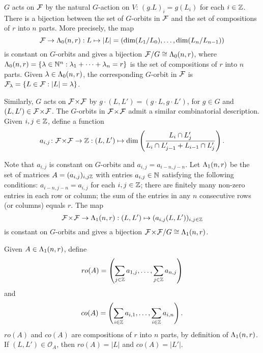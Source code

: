 \documentclass[a4paper, 11pt]{report}
\begin{document}
$G$ acts on $\mathcal{F}$ by the natural $G$-action on $V$: $(g.L)_i = g(L_i)$ for each $i\in\mathbb{Z}$. There is a bijection between the set of $G$-orbits in $\mathcal{F}$ and the set of compositions of $r$ into $n$ parts. More precisely, the map
\begin{equation*}
\mathcal{F}\to\Lambda_0(n,r):L\mapsto |L|=\left(\dim(L_1/L_0),\ldots,\dim(L_n/L_{n-1})\right)
\end{equation*}
is constant on $G$-orbits and gives a bijection $\mathcal{F}/G\cong\Lambda_0(n,r)$, where $\Lambda_0(n,r)=\{\lambda\in\mathbb{N}^n: \lambda_1+\cdots +\lambda_n = r\}$ is the set of compositions of $r$ into $n$ parts. Given $\lambda\in\Lambda_0(n,r)$, the corresponding $G$-orbit in $\mathcal{F}$ is $\mathcal{F}_\lambda=\{L\in\mathcal{F}:|L|=\lambda\}$.

Similarly, $G$ acts on ${\mathcal{F}\!\times\!\mathcal{F}}$ by $g\cdot (L,L') = (g\cdot L,g\cdot L')$, for $g\in G$ and $(L,L')\in{\mathcal{F}\!\times\!\mathcal{F}}$. The $G$-orbits in ${\mathcal{F}\!\times\!\mathcal{F}}$ admit a similar combinatorial description. Given $i,j\in\mathbb{Z}$, define a function
\begin{equation*}
a_{i,j}\colon{\mathcal{F}\!\times\!\mathcal{F}}\to\mathbb{Z}:(L,L')\mapsto \dim\left(\frac{L_i\cap L_j'}{L_i\cap L_{j-1}' + L_{i-1}\cap L_j'}\right).
\end{equation*}

Note that $a_{i,j}$ is constant on $G$-orbits and $a_{i,j}=a_{i-n,j-n}$. Let $\Lambda_1(n,r)$ be the set of matrices $A=(a_{i,j})_{i,j\mathbb{Z}}$ with entries $a_{i,j}\in\mathbb{N}$ satisfying the following conditions: $a_{i-n,j-n} = a_{i,j}$ for each $i,j\in\mathbb{Z}$; there are finitely many non-zero entries in each row or column; the sum of the entries in any $n$ consecutive rows (or columns) equals $r$. The map
\begin{equation*}
{\mathcal{F}\!\times\!\mathcal{F}}\to\Lambda_1(n,r):(L,L')\mapsto (a_{i,j}(L,L'))_{i,j\in\mathbb{Z}}
\end{equation*}
is constant on $G$-orbits and gives a bijection ${\mathcal{F}\!\times\!\mathcal{F}}/G\cong\Lambda_1(n,r)$.


Given $A\in\Lambda_1(n,r)$, define
\begin{equation*}
ro(A) = \left( \sum_{j\in\mathbb{Z}}a_{1,j}, \ldots, \sum_{j\in\mathbb{Z}} a_{n,j}\right)
\end{equation*}
and
\begin{equation*}
co(A) = \left( \sum_{i\in\mathbb{Z}} a_{i,1}, \ldots, \sum_{i\in\mathbb{Z}} a_{i,n}\right).
\end{equation*}
$ro(A)$ and $co(A)$ are compositions of $r$ into $n$ parts, by definition of $\Lambda_1(n,r)$. If $(L,L')\in\mathcal{O}_A$, then $ro(A)=|L|$ and $co(A) = |L'|$.
\end{document}
